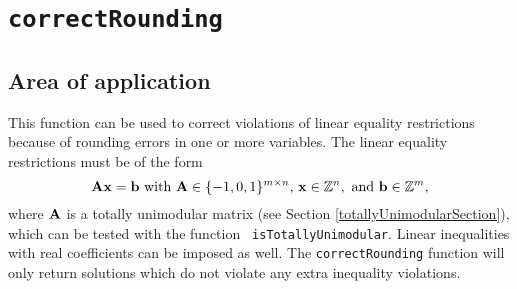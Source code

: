 \documentclass[11pt, fleqn, a4paper]{article}
\begin{document}
\section{\tt correctRounding}
\label{roundingErrors}
\subsection{Area of application}
This function can be used to correct violations of linear equality
restrictions because of rounding errors in one or more variables.
The linear equality restrictions must be of the form
\begin{displaymath}
{\bf A}{\bf x} = {\bf b} \textrm{ with } {\bf A}\in \{-1,0,1\}^{m\times n}\textrm{, } {\bf x}\in \mathbb{Z}^{n},\textrm{ and } {\bf b}\in\mathbb{Z}^m,
\end{displaymath}
where $\bf A$ is a totally unimodular matrix (see Section
\ref{totallyUnimodularSection}), which can be tested with the function {\tt
isTotallyUnimodular}. Linear inequalities with real coefficients can be imposed
as well. The {\tt correctRounding} function will only return solutions which do
not violate any extra inequality violations.
\end{document}
